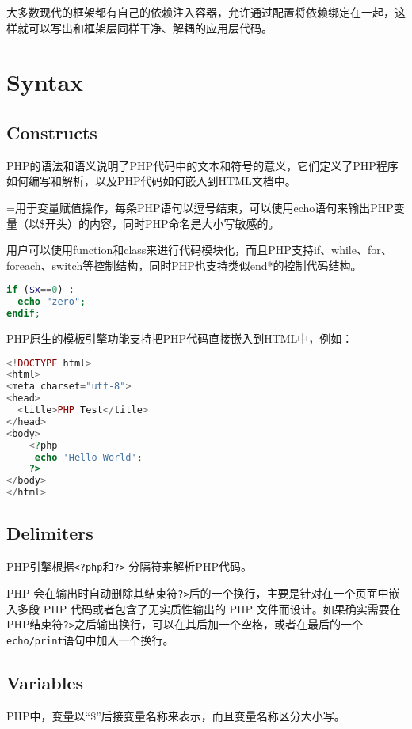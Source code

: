 大多数现代的框架都有自己的依赖注入容器，允许通过配置将依赖绑定在一起，这样就可以写出和框架层同样干净、解耦的应用层代码。


\chapter{Syntax}


\section{Constructs}


PHP的语法和语义说明了PHP代码中的文本和符号的意义，它们定义了PHP程序如何编写和解析，以及PHP代码如何嵌入到HTML文档中。

=用于变量赋值操作，每条PHP语句以逗号结束，可以使用echo语句来输出PHP变量（以\$开头）的内容，同时PHP命名是大小写敏感的。

用户可以使用function和class来进行代码模块化，而且PHP支持if、while、for、foreach、switch等控制结构，同时PHP也支持类似end*的控制代码结构。

\begin{lstlisting}[language=PHP]
if ($x==0) : 
  echo "zero"; 
endif;
\end{lstlisting}


PHP原生的模板引擎功能支持把PHP代码直接嵌入到HTML中，例如：

\begin{lstlisting}[language=PHP]
<!DOCTYPE html>
<html>
<meta charset="utf-8">
<head>
  <title>PHP Test</title>
</head>
<body>
	<?php
	 echo 'Hello World';
	?>
</body>
</html>
\end{lstlisting}


\section{Delimiters}


PHP引擎根据\texttt{<?php}和\texttt{?>} 分隔符来解析PHP代码。

PHP 会在输出时自动删除其结束符\texttt{?>}后的一个换行，主要是针对在一个页面中嵌入多段 PHP 代码或者包含了无实质性输出的 PHP 文件而设计。如果确实需要在PHP结束符\texttt{?>}之后输出换行，可以在其后加一个空格，或者在最后的一个\texttt{echo/print}语句中加入一个换行。

\section{Variables}


PHP中，变量以“\$”后接变量名称来表示，而且变量名称区分大小写。

